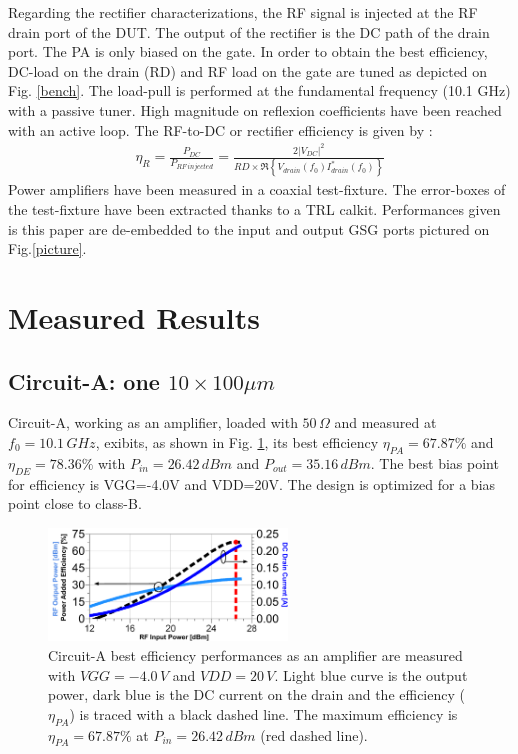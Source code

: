 \documentclass[conference]{IEEEtran}
\begin{document}
Regarding the rectifier characterizations, the RF signal is injected at the RF drain port of the DUT. The output of the rectifier is the DC path of the drain port. The PA is only biased on the gate. In order to obtain the best efficiency, DC-load on the drain (RD) and RF load on the gate are tuned as depicted on Fig. \ref{bench}. The load-pull is performed at the fundamental frequency (10.1 GHz) with a passive tuner. High magnitude on reflexion coefficients have been reached with an active loop.
The RF-to-DC or rectifier efficiency is given by :
\begin{eqnarray}
\eta_{R}=\frac{P_{DC}}{P_{RF\,injected}}=\frac{2{\left|V_{DC}\right|}^2}{RD \times \Re{\left\{V_{drain}\left(f_0\right)I^{*}_{drain}\left(f_0\right)\right\}}}
\end{eqnarray}
Power amplifiers have been measured in a coaxial test-fixture. The error-boxes of the test-fixture have been extracted thanks to a TRL calkit. Performances given is this paper are de-embedded to the input and output GSG ports pictured on Fig.\;\ref{picture}.



\section{Measured Results}

\subsection{Circuit-A: one $10\times100\mu m$}
Circuit-A, working as an amplifier, loaded with $50\,\Omega$ and measured at $f_0=10.1\,GHz$, exibits, as shown in Fig. \ref{mike_amp}, its best efficiency $\eta_{PA}=67.87\%$ and $\eta_{DE}=78.36\%$ with $P_{in}=26.42\,dBm$ and  $P_{out}=35.16\,dBm$. The best bias point for efficiency is VGG=-4.0V and VDD=20V. The design is optimized for a bias point close to class-B.

\begin{figure}[ht!] %
\centering
\includegraphics[width=2.5in]{IMS2014_Mike_Amplifier.pdf}
\caption{ Circuit-A best efficiency performances as an amplifier are measured with $VGG=-4.0\,V$ and $VDD=20\,V$. Light blue curve is the output power, dark blue is the DC current on the drain and the efficiency ($\eta_{PA}$) is traced with a black dashed line. The maximum efficiency is $\eta_{PA}=67.87\%$ at $P_{in}=26.42\,dBm$ (red dashed line).}
\label{mike_amp}
\end{figure}
\end{document}
